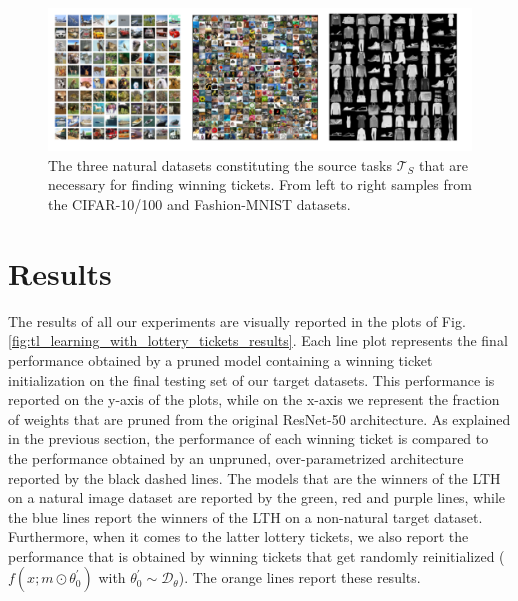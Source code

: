 \begin{figure}
  \centering
   \includegraphics[width=\linewidth,height=\textheight,keepaspectratio]{./Images/Chapter06/natural_datasets.png}
   \caption{The three natural datasets constituting the source tasks $\mathcal{T}_S$ that are necessary for finding winning tickets. From left to right samples from the CIFAR-10/100 and Fashion-MNIST datasets.}
\label{fig:natural_source_datasets}
\end{figure}


\section{Results}
\label{sec:results}
The results of all our experiments are visually reported in the plots of Fig. \ref{fig:tl_learning_with_lottery_tickets_results}. Each line plot represents the final performance obtained by a pruned model containing a winning ticket initialization on the final testing set of our target datasets. This performance is reported on the y-axis of the plots, while on the x-axis we represent the fraction of weights that are pruned from the original ResNet-50 architecture. As explained in the previous section, the performance of each winning ticket is compared to the performance obtained by an unpruned, over-parametrized architecture reported by the black dashed lines. The models that are the winners of the LTH on a natural image dataset are reported by the green, red and purple lines, while the blue lines report the winners of the LTH on a non-natural target dataset. Furthermore, when it comes to the latter lottery tickets, we also report the performance that is obtained by winning tickets that get randomly reinitialized ($f(x;m\odot\theta^{'}_{0})$ with $\theta^{'}_{0} \sim \mathscr{D}_\theta$). The orange lines report these results. 

